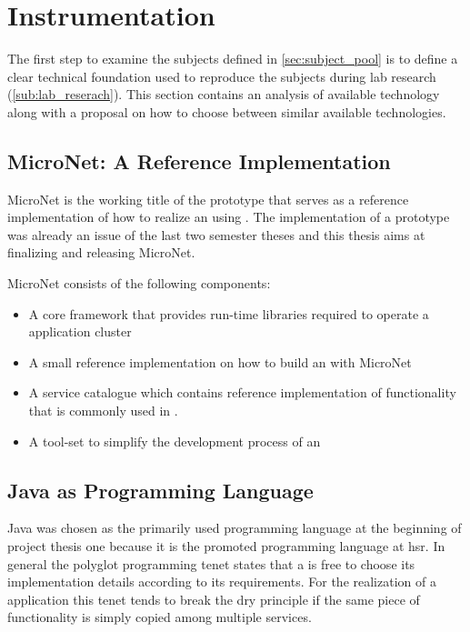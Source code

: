 \section{Instrumentation}
\label{sub:instrumentation}

The first step to examine the subjects defined in \autoref{sec:subject_pool} is
to define a clear technical foundation used to reproduce the subjects during lab
research (\autoref{sub:lab_reserach}). This section contains an analysis of
available technology along with a proposal on how to choose between similar
available technologies.

\subsection{MicroNet: A Reference Implementation}

MicroNet is the working title of the prototype that serves as a reference
implementation of how to realize an \og{} using \mss{}. The implementation of a
prototype was already an issue of the last two semester theses and this thesis
aims at finalizing and releasing MicroNet.

MicroNet consists of the following components:

\begin{itemize}
  \item A core framework that provides run-time libraries required to operate a
  \ms{} \og{} application cluster
  \item A small reference implementation on how to build an \og{} with MicroNet
  \item A service catalogue which contains reference implementation of
  functionality that is commonly used in \ogs{}.
  \item A tool-set to simplify the development process of an \og{} 
\end{itemize}

\subsection{Java as Programming Language}

Java was chosen as the primarily used programming language at the beginning of
project thesis one because it is the promoted programming language at \gls{hsr}.
In general the polyglot programming tenet states that a \ms{} is free to choose
its implementation details according to its requirements. For the realization of
a \ms{} application this tenet tends to break the \gls{dry} principle if the
same piece of functionality is simply copied among multiple services.

